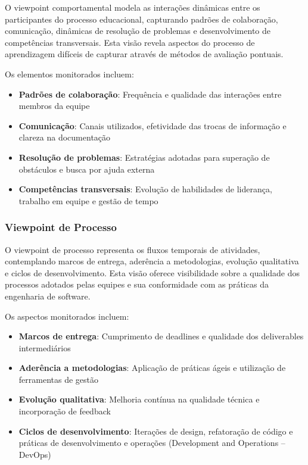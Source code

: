 \documentclass[english, spanish, brazilian]{modelo_dt}
\begin{document}
O viewpoint comportamental modela as interações dinâmicas entre os participantes do processo educacional, capturando padrões de colaboração, comunicação, dinâmicas de resolução de problemas e desenvolvimento de competências transversais\@. Esta visão revela aspectos do processo de aprendizagem difíceis de capturar através de métodos de avaliação pontuais\@.

Os elementos monitorados incluem:
\begin{itemize}
\item \textbf{Padrões de colaboração}: Frequência e qualidade das interações entre membros da equipe
\item \textbf{Comunicação}: Canais utilizados, efetividade das trocas de informação e clareza na documentação
\item \textbf{Resolução de problemas}: Estratégias adotadas para superação de obstáculos e busca por ajuda externa
\item \textbf{Competências transversais}: Evolução de habilidades de liderança, trabalho em equipe e gestão de tempo
\end{itemize}

\subsubsection{Viewpoint de Processo}

O viewpoint de processo representa os fluxos temporais de atividades, contemplando marcos de entrega, aderência a metodologias, evolução qualitativa e ciclos de desenvolvimento\@. Esta visão oferece visibilidade sobre a qualidade dos processos adotados pelas equipes e sua conformidade com as práticas da engenharia de software\@.

Os aspectos monitorados incluem:
\begin{itemize}
\item \textbf{Marcos de entrega}: Cumprimento de deadlines e qualidade dos deliverables intermediários
\item \textbf{Aderência a metodologias}: Aplicação de práticas ágeis e utilização de ferramentas de gestão
\item \textbf{Evolução qualitativa}: Melhoria contínua na qualidade técnica e incorporação de feedback
\item \textbf{Ciclos de desenvolvimento}: Iterações de design, refatoração de código e práticas de desenvolvimento e operações (Development and Operations -- DevOps)
\end{itemize}
\end{document}

